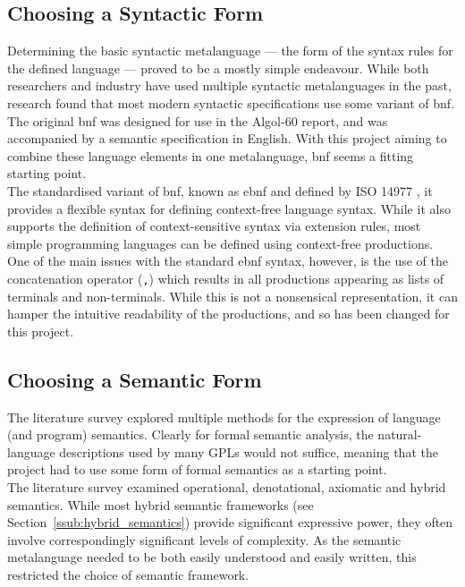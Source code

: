 \subsection{Choosing a Syntactic Form} %
\label{sub:choosing_a_syntactic_form}
Determining the basic syntactic metalanguage --- the form of the syntax rules for the defined language --- proved to be a mostly simple endeavour. 
While both researchers and industry have used multiple syntactic metalanguages in the past, research found that most modern syntactic specifications use some variant of \gls{bnf}. 
The original \gls{bnf} was designed for use in the Algol-60 report, and was accompanied by a semantic specification in English. 
With this project aiming to combine these language elements in one metalanguage, \gls{bnf} seems a fitting starting point. \\

The standardised variant of \gls{bnf}, known as \gls{ebnf} and defined by ISO 14977 \citep{standard1996ebnf}, it provides a flexible syntax for defining context-free language syntax. 
While it also supports the definition of context-sensitive syntax via extension rules, most simple programming languages can be defined using context-free productions. \\

One of the main issues with the standard \gls{ebnf} syntax, however, is the use of the concatenation operator (\lstinline{,}) which results in all productions appearing as lists of terminals and non-terminals.
While this is not a nonsensical representation, it can hamper the intuitive readability of the productions, and so has been changed for this project.


\subsection{Choosing a Semantic Form} %
\label{sub:choosing_a_semantic_form}
The literature survey explored multiple methods for the expression of language (and program) semantics.
Clearly for formal semantic analysis, the natural-language descriptions used by many GPLs would not suffice, meaning that the project had to use some form of formal semantics as a starting point. \\

The literature survey examined operational, denotational, axiomatic and hybrid semantics.
While most hybrid semantic frameworks (see Section~\ref{ssub:hybrid_semantics}) provide significant expressive power, they often involve correspondingly significant levels of complexity.
As the semantic metalanguage needed to be both easily understood and easily written, this restricted the choice of semantic framework.\\


